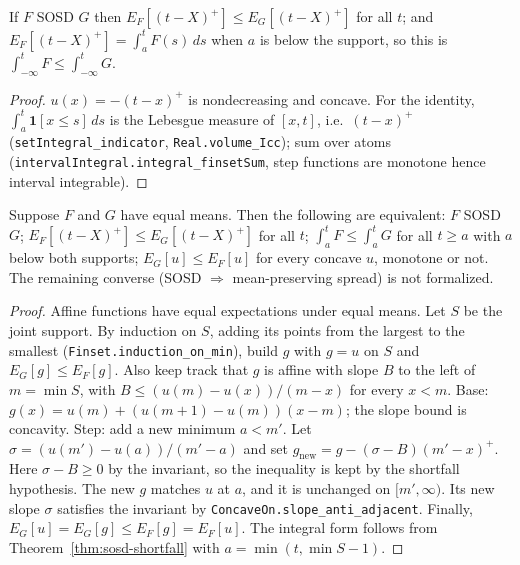 \begin{theorem}
\label{thm:sosd-shortfall}
\leanok
{}
If $F$ SOSD $G$ then $E_F[(t-X)^+] \le E_G[(t-X)^+]$ for all $t$; and $E_F[(t-X)^+] = \int_a^t F(s)\,ds$
when $a$ is below the support, so this is $\int_{-\infty}^t F \le \int_{-\infty}^t G$.
\end{theorem}
\begin{proof}
\leanok
$u(x) = -(t-x)^+$ is nondecreasing and concave. For the identity, $\int_a^t \mathbf 1[x \le s]\,ds$ is
the Lebesgue measure of $[x,t]$, i.e.\ $(t-x)^+$ (\texttt{setIntegral\_indicator},
\texttt{Real.volume\_Icc}); sum over atoms (\texttt{intervalIntegral.integral\_finsetSum}, step
functions are monotone hence interval integrable).
\end{proof}

\begin{theorem}
\label{thm:sosd-converse}
\leanok
{}
Suppose $F$ and $G$ have equal means. Then the following are equivalent: $F$ SOSD $G$;
$E_F[(t-X)^+] \le E_G[(t-X)^+]$ for all $t$; $\int_a^t F \le \int_a^t G$ for all $t \ge a$ with $a$ below both
supports; $E_G[u] \le E_F[u]$ for every concave $u$, monotone or not. The remaining converse
(SOSD $\Rightarrow$ mean-preserving spread) is not formalized.
\end{theorem}
\begin{proof}
\leanok
Affine functions have equal expectations under equal means. Let $S$ be the joint support. By induction
on $S$, adding its points from the largest to the smallest (\texttt{Finset.induction\_on\_min}), build
$g$ with $g = u$ on $S$ and $E_G[g] \le E_F[g]$. Also keep track that $g$ is affine with slope $B$ to the
left of $m = \min S$, with $B \le (u(m)-u(x))/(m-x)$ for every $x < m$. Base: $g(x) = u(m) +
(u(m+1)-u(m))(x-m)$; the slope bound is concavity. Step: add a new minimum $a < m'$. Let
$\sigma = (u(m')-u(a))/(m'-a)$ and set $g_{\text{new}} = g - (\sigma - B)(m'-x)^+$. Here
$\sigma - B \ge 0$ by the invariant, so the inequality is kept by the shortfall hypothesis. The new $g$
matches $u$ at $a$, and it is unchanged on $[m',\infty)$. Its new slope $\sigma$ satisfies the
invariant by \texttt{ConcaveOn.slope\_anti\_adjacent}. Finally,
$E_G[u] = E_G[g] \le E_F[g] = E_F[u]$. The integral form follows from
Theorem~\ref{thm:sosd-shortfall} with $a = \min(t, \min S - 1)$.
\end{proof}

